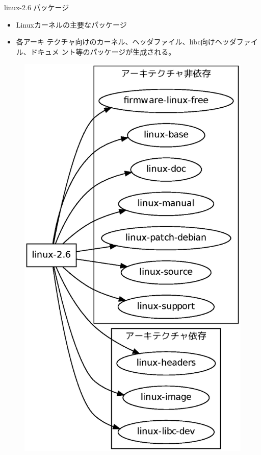 \begin{frame}[containsverbatim]{linux-2.6 パッケージ}

\begin{table}[ht]
\begin{minipage}{0.3\hsize}
\begin{itemize}
\item Linuxカーネルの主要なパッケージ
\item 各アーキ
テクチャ向けのカーネル、ヘッダファイル、libc向けヘッダファイル、ドキュメ
ント等のパッケージが生成される。
\end{itemize}

\end{minipage}
\begin{minipage}{0.6\hsize}
\begin{figure}[H]
\begin{center}
\includegraphics[width=0.8\hsize]{image201005/debian-kernel-package.eps}
\end{center}
\end{figure}
\end{minipage}
\end{table}
\end{frame}


